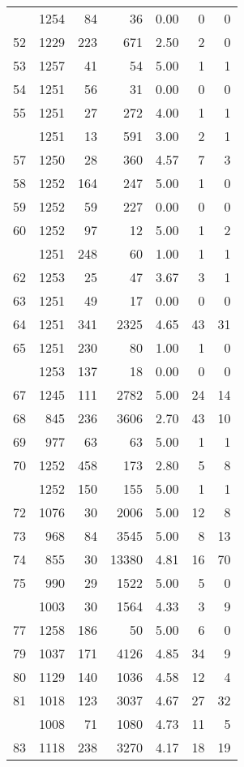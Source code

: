 \documentclass[
]{article}
\begin{document}
\begin{table}
\begin{tabular}[t]{lrrrrrr}
\addlinespace
51 & 1254 & 84 & 36 & 0.00 & 0 & 0\\
52 & 1229 & 223 & 671 & 2.50 & 2 & 0\\
53 & 1257 & 41 & 54 & 5.00 & 1 & 1\\
54 & 1251 & 56 & 31 & 0.00 & 0 & 0\\
55 & 1251 & 27 & 272 & 4.00 & 1 & 1\\
\addlinespace
56 & 1251 & 13 & 591 & 3.00 & 2 & 1\\
57 & 1250 & 28 & 360 & 4.57 & 7 & 3\\
58 & 1252 & 164 & 247 & 5.00 & 1 & 0\\
59 & 1252 & 59 & 227 & 0.00 & 0 & 0\\
60 & 1252 & 97 & 12 & 5.00 & 1 & 2\\
\addlinespace
61 & 1251 & 248 & 60 & 1.00 & 1 & 1\\
62 & 1253 & 25 & 47 & 3.67 & 3 & 1\\
63 & 1251 & 49 & 17 & 0.00 & 0 & 0\\
64 & 1251 & 341 & 2325 & 4.65 & 43 & 31\\
65 & 1251 & 230 & 80 & 1.00 & 1 & 0\\
\addlinespace
66 & 1253 & 137 & 18 & 0.00 & 0 & 0\\
67 & 1245 & 111 & 2782 & 5.00 & 24 & 14\\
68 & 845 & 236 & 3606 & 2.70 & 43 & 10\\
69 & 977 & 63 & 63 & 5.00 & 1 & 1\\
70 & 1252 & 458 & 173 & 2.80 & 5 & 8\\
\addlinespace
71 & 1252 & 150 & 155 & 5.00 & 1 & 1\\
72 & 1076 & 30 & 2006 & 5.00 & 12 & 8\\
73 & 968 & 84 & 3545 & 5.00 & 8 & 13\\
74 & 855 & 30 & 13380 & 4.81 & 16 & 70\\
75 & 990 & 29 & 1522 & 5.00 & 5 & 0\\
\addlinespace
76 & 1003 & 30 & 1564 & 4.33 & 3 & 9\\
77 & 1258 & 186 & 50 & 5.00 & 6 & 0\\
79 & 1037 & 171 & 4126 & 4.85 & 34 & 9\\
80 & 1129 & 140 & 1036 & 4.58 & 12 & 4\\
81 & 1018 & 123 & 3037 & 4.67 & 27 & 32\\
\addlinespace
82 & 1008 & 71 & 1080 & 4.73 & 11 & 5\\
83 & 1118 & 238 & 3270 & 4.17 & 18 & 19\\

\end{tabular}
\end{table}
\end{document}
